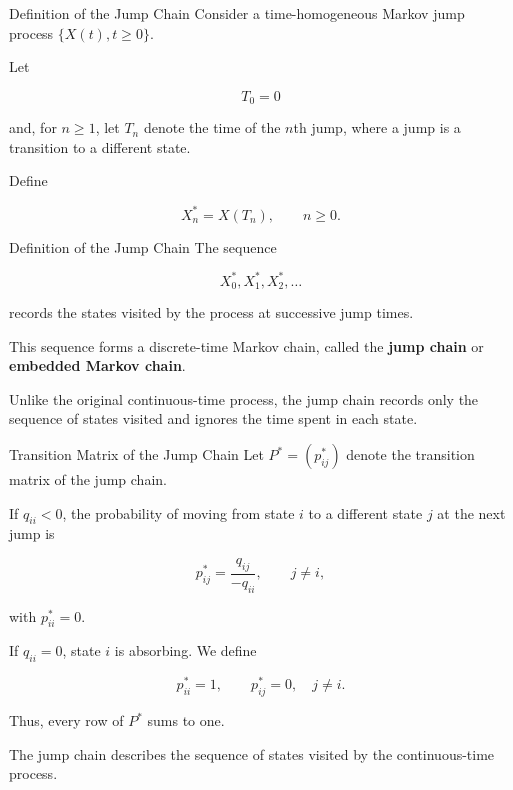 \documentclass[
  ignorenonframetext,
  aspectratio=169,
]{beamer}
\begin{document}
\begin{frame}{Definition of the Jump Chain}
\protect{}\label{definition-of-the-jump-chain}
Consider a time-homogeneous Markov jump process \(\{X(t),t\geq 0\}\).

Let

\[
T_0=0
\]

and, for \(n\geq 1\), let \(T_n\) denote the time of the \(n\)th jump,
where a jump is a transition to a different state.

Define

\[
X_n^*=X(T_n),\qquad n\geq 0.
\]
\end{frame}

\begin{frame}{Definition of the Jump Chain}
\protect{}\label{definition-of-the-jump-chain-1}
The sequence

\[
X_0^*,X_1^*,X_2^*,\ldots
\]

records the states visited by the process at successive jump times.

This sequence forms a discrete-time Markov chain, called the
\textbf{jump chain} or \textbf{embedded Markov chain}.

Unlike the original continuous-time process, the jump chain records only
the sequence of states visited and ignores the time spent in each state.
\end{frame}

\begin{frame}{Transition Matrix of the Jump Chain}
\protect{}\label{transition-matrix-of-the-jump-chain}
Let \(P^*=(p_{ij}^*)\) denote the transition matrix of the jump chain.

If \(q_{ii}<0\), the probability of moving from state \(i\) to a
different state \(j\) at the next jump is

\[
\boxed{
p_{ij}^*=\frac{q_{ij}}{-q_{ii}},
\qquad j\neq i,
}
\]

with \(p_{ii}^*=0.\)

If \(q_{ii}=0\), state \(i\) is absorbing. We define

\[
p_{ii}^*=1,
\qquad
p_{ij}^*=0,\quad j\neq i.
\]

Thus, every row of \(P^*\) sums to one.

The jump chain describes the sequence of states visited by the
continuous-time process.
\end{frame}
\end{document}
